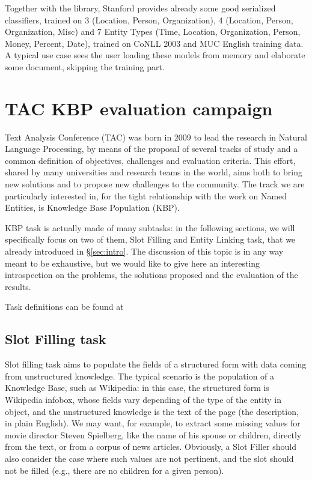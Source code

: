 \documentclass[a4paper,11pt]{report}
\begin{document}
Together with the library, Stanford provides already some good serialized classifiers, trained on 3 (Location, Person, Organization), 4 (Location, Person, Organization, Misc) and 7 Entity Types (Time, Location, Organization, Person, Money, Percent, Date), trained on CoNLL 2003 and MUC English training data. A typical use case sees the user loading these models from memory and elaborate some document, skipping the training part.

\chapter{TAC KBP evaluation campaign}
Text Analysis Conference (TAC) was born in 2009 to lead the research in Natural Language Processing, by means of the proposal of several tracks of study and a common definition of objectives, challenges and evaluation criteria. This effort, shared by many universities and research teams in the world, aims both to bring new solutions and to propose new challenges to the community. The track we are particularly interested in, for the tight relationship with the work on Named Entities, is Knowledge Base Population (KBP).

KBP task is actually made of many subtasks: in the following sections, we will specifically focus on two of them, Slot Filling and Entity Linking task, that we already introduced in \S \ref{sec:intro}. The discussion of this topic is in any way meant to be exhaustive, but we would like to give here an interesting introspection on the problems, the solutions proposed and the evaluation of the results.

Task definitions can be found at %


\section{Slot Filling task}
Slot filling task aims to populate the fields of a structured form with data coming from unstructured knowledge. The typical scenario is the population of a Knowledge Base, such as Wikipedia: in this case, the structured form is Wikipedia infobox, whose fields vary depending of the type of the entity in object, and the unstructured knowledge is the text of the page (the description, in plain English).
We may want, for example, to extract some missing values for movie director Steven Spielberg, like the name of his spouse or children, directly from the text, or from a corpus of news articles. Obviously, a Slot Filler should also consider the case where such values are not pertinent, and the slot should not be filled (e.g., there are no children for a given person).
\end{document}
